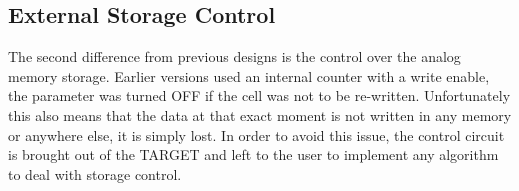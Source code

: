 \subsection{External Storage Control}
The second difference from previous designs is the control over the analog memory storage. Earlier versions used an internal counter with a write enable, the parameter was turned OFF if the cell was not to be re-written. Unfortunately this also means that the data at that exact moment is not written in any memory or anywhere else, it is simply lost. In order to avoid this issue, the control circuit is brought out of the TARGET and left to the user to implement any algorithm to deal with storage control.
